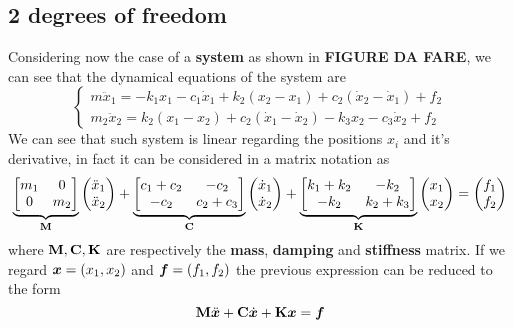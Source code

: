 \subsection{2 degrees of freedom}
	Considering now the case of a  \textbf{system} as shown in \textbf{FIGURE DA FARE}, we can see that the dynamical equations of the system are
	\[ \begin{cases}
		m \ddot x_1 = - k_1 x_1 - c_1 \dot x_1 + k_2(x_2-x_1) + c_2(\dot x_2 - \dot x_1) + f_2 \\
		m_2 \ddot x_2 = k_2 (x_1-x_2) + c_2(\dot x_1 - \dot x_2) - k_3x_2 - c_3 \dot x_2 + f_2
	\end{cases} \]
	We can see that such system is linear regarding the positions $x_i$ and it's derivative, in fact it can be considered in a matrix notation as
	\begin{equation}
		\underbrace{ \begin{bmatrix} m_1 & 0 \\ 0 & m_2 \end{bmatrix}}_{\mathbf{M}} \begin{pmatrix} \ddot x_1 \\ \ddot x_2 \end{pmatrix} + \underbrace{ \begin{bmatrix} c_1+c_2 & - c_2 \\ - c_2 & c_2 + c_3 \end{bmatrix}}_{\mathbf{C}} \begin{pmatrix} \dot x_1 \\ \dot x_2 \end{pmatrix} + \underbrace{\begin{bmatrix} k_1+k_2 & -k_2 \\ - k_2 & k_2+k_3 \end{bmatrix}}_{\mathbf{K}} \begin{pmatrix} x_1 \\ x_2 \end{pmatrix} = \begin{pmatrix} f_1 \\ f_2 \end{pmatrix}
	\end{equation}
	where $\mathbf{M}, \mathbf{C}, \mathbf{K}$ are respectively the \textbf{mass}, \textbf{damping} and \textbf{stiffness} matrix. If we regard $\boldsymbol{x} = (x_1,x_2)$ and $\boldsymbol{f} = (f_1,f_2)$ the previous expression can be reduced to the form
	\begin{equation}
		\mathbf{M} \ddot{\boldsymbol{x}} + \mathbf{C} \dot{\boldsymbol{x}} + \mathbf{K} \boldsymbol{x}= \boldsymbol{f}
	\end{equation}
	

